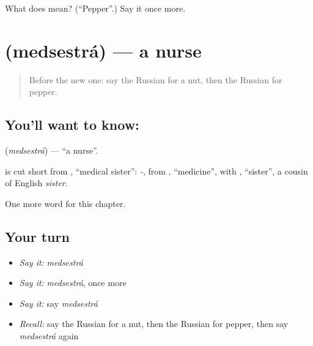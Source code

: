 \begin{tcolorbox}[breakable,colback=teal!4,colframe=teal!35!black,title={Before you move on}]
What does  mean? (\textquotedblleft{}Pepper\textquotedblright{}.) Say it once more.
\end{tcolorbox}
\section[\texorpdfstring{\ru{медсестра} (medsestrá)}{медсестра (medsestrá)}]{ (medsestrá) — a nurse}

\label{lesson:RU-C107-nurse}



\begin{quote}
Before the new one: say the Russian for a nut, then the Russian for pepper.
\end{quote}

\subsection*{You'll want to know: }
\textbf{} (\emph{medsestrá}) — \textquotedblleft{}a nurse\textquotedblright{}.

\begin{cousinweb}
\textbf{} is cut short from \emph{ }, \textquotedblleft{}medical sister\textquotedblright{}: \emph{-}, from \emph{}, \textquotedblleft{}medicine\textquotedblright{}, with \emph{}, \textquotedblleft{}sister\textquotedblright{}, a cousin of English \emph{sister}.
\end{cousinweb}

\begin{grammarlens}[title={What you've built}]
One more word for this chapter.
\end{grammarlens}

\subsection*{Your turn}
\begin{itemize}
\raggedright
  \item \emph{Say it:} \emph{medsestrá}
  \item \emph{Say it:} \emph{medsestrá}, once more
  \item \emph{Say it:} say \emph{medsestrá}
  \item \emph{Recall:} say the Russian for a nut, then the Russian for pepper, then say \emph{medsestrá} again
\end{itemize}

